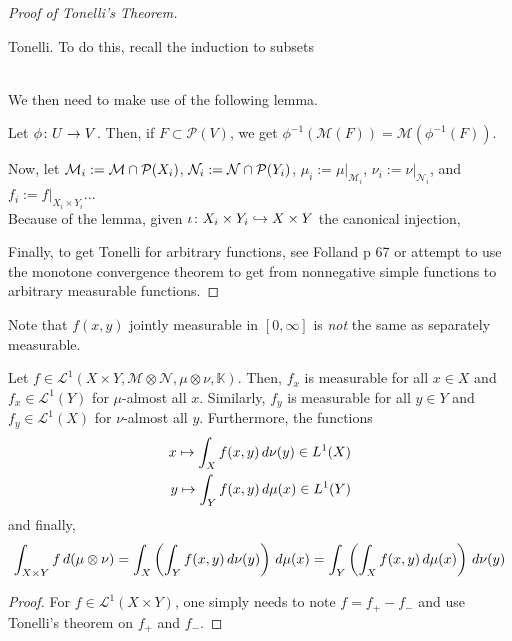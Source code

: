 \documentclass[11pt,leqno,oneside]{amsbook}
\numberwithin{thm}{section}
\renewcommand{\P}{\mathcal{P}} %
\renewcommand{\A}{\mathcal{A}} %
\newcommand{\M}{\mathcal{M}} %
\newcommand{\Ep}{\mathcal{E}} %
\newcommand{\cL}{\mathcal{L}}
\newcommand{\cN}{\mathcal{N}}
\newcommand{\cC}{\mathcal{C}} %
\newcommand{\K}{\mathbb{K}} %
\newcommand{\ox}{\otimes}
\begin{document}
\begin{proof}[Proof of Tonelli's Theorem]
\begin{itemize}
    Tonelli. To do this, recall the induction to subsets \\
     \\
    We then need to make use of the following lemma.
    \begin{lem}
      Let \(\phi \colon U \to V\). Then, if \(F \subset \P(V)\), we get
      \(\phi^{-1}(\M(F)) = \M(\phi^{-1}(F))\).
    \end{lem}
    Now, let \(\M_i := \M \intersect \P(X_i)\), \(\cN_i := \cN
    \intersect \P(Y_i)\), \(\mu_i := \mu|_{\M_i}\), \(\nu_i :=
    \nu|_{\cN_i}\), and \(f_i := f|_{X_i \times Y_i}\)...\\

    Because of the lemma, given \(\iota \colon X_i \times Y_i \hookrightarrow X
    \times Y\) the canonical injection,
  \end{itemize}
  Finally, to get Tonelli for arbitrary functions, see Folland p 67 or
  attempt to use the monotone convergence theorem to get from
  nonnegative simple functions to arbitrary measurable functions.
\end{proof}
\begin{rmk}
  Note that \(f(x,y)\) jointly measurable in \([0,\infty]\) is
  \emph{not} the same as separately measurable. 
\end{rmk}
\begin{thm}
  Let \(f \in \cL^1(X\times Y, \M \ox \cN, \mu \ox \nu, \K)\). Then,
  \(f_x\) is measurable for all \(x \in X\)  and \(f_x \in \cL^1(Y)\)
  for \(\mu\)-almost all \(x\). Similarly, \(f_y\) is measurable for
  all \(y \in Y\) and \(f_y \in \cL^1(X)\) for \(\nu\)-almost all
  \(y\). Furthermore, the functions
  \begin{align*}
    x \mapsto \int_X f(x,y) \, d\nu(y) \in L^1(X) \\
    y \mapsto \int_Y f(x,y) \, d\mu(x) \in L^1(Y)
  \end{align*}
  and finally, \[
    \int_{X \times Y} f \d(\mu \ox \nu) = \int_X \left( \int_Y f(x,y)
      \d\nu(y) \right) \d\mu(x) = \int_Y \left( \int_X f(x,y) \d\mu(x)
    \right) \d\nu(y)
  \]
\end{thm}
\begin{proof}
  For \(f \in \cL^1(X \times Y)\), one simply needs to note \(f = f_+
  - f_-\) and use Tonelli's theorem on \(f_+\) and \(f_-\). 
\end{proof}
\end{document}
